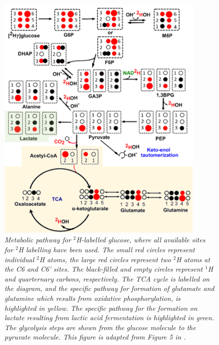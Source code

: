 \begin{figure}
    \centering
    \includegraphics[width=0.9\textwidth]{Figures/Intro/D7_Metabolism.png}
    \caption{\textit{Metabolic pathway for $^2$H-labelled glucose, where all available sites for $^2$H labelling have been used. The small red circles represent individual $^2$H atoms, the large red circles represent two $^2$H atoms at the C6 and C6' sites. The black-filled and empty circles represent $^1$H and quarternary carbons, respectively. The \ac{TCA} cycle is labelled on the diagram, and the specific pathway for formation of glutamate and glutamine which results from oxidative phosphorylation, is highlighted in yellow. The specific pathway for the formation on lactate resulting from lactic acid fermentation is highlighted in green. The glycolysis steps are shown from the glucose molecule to the pyruvate molecule. This figure is adapted from Figure 5 in \cite{Mahar2021DeuteratedGlucose}.}}
    \label{fig:intro:D7Metabolism}
\end{figure}

